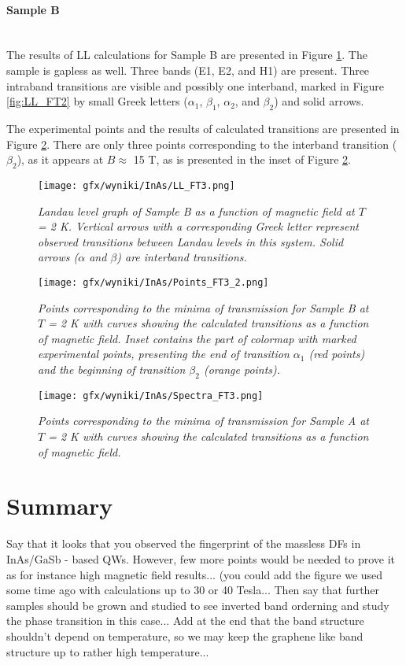 \documentclass[titlepage,a4paper]{book}
\newcommand{\wciecie}{\quad\phantom{v}}
\newcommand{\myparagraph}[1]{\paragraph{#1}\mbox{}\\}
\begin{document}
\myparagraph{Sample B}
\wciecie
The results of LL calculations for Sample B are presented in Figure \ref{fig:LL_FT3}. The sample is gapless as well. Three bands (E1, E2, and H1) are present. Three intraband transitions are visible and possibly one interband, marked in Figure \ref{fig:LL_FT2} by small Greek letters ($\alpha_1$, $\beta_1$, $\alpha_2$, and $\beta_2$) and solid arrows. 

The experimental points and the results of calculated transitions are presented in Figure \ref{fig:Points_FT3}. There are only three points corresponding to the interband transition ($\beta_2$), as it appears at $B \approx$ 15 T, as is presented in the inset of Figure \ref{fig:Points_FT3}.  

\begin{figure}[H]
	\centering
	\texttt{[image: gfx/wyniki/InAs/LL\_FT3.png]}
	\vspace{-10pt}
	\caption{\textit{Landau level graph of Sample B as a function of magnetic field at $T$ = 2 K. Vertical arrows with a corresponding Greek letter represent observed transitions between Landau levels in this system. Solid arrows ($\alpha$ and $\beta$) are interband transitions.}}
	\label{fig:LL_FT3}
\end{figure}

\begin{figure}[H]
	\centering
	\texttt{[image: gfx/wyniki/InAs/Points\_FT3\_2.png]}
	\vspace{-10pt}
	\caption{\textit{Points corresponding to the minima of transmission for Sample B at $T$ = 2 K with curves showing the calculated transitions as a function of magnetic field. Inset contains the part of colormap with marked experimental points, presenting the end of transition $\alpha_1$ (red points) and the beginning of transition $\beta_2$ (orange points). }}
	\label{fig:Points_FT3}
\end{figure}

\begin{figure}[H]
	\centering
	\texttt{[image: gfx/wyniki/InAs/Spectra\_FT3.png]}
	\vspace{-10pt}
	\caption{\textit{Points corresponding to the minima of transmission for Sample A at $T$ = 2 K with curves showing the calculated transitions as a function of magnetic field.}}
	\label{fig:Spectra_FT3}
\end{figure}

\section{Summary}
\wciecie
Say that it looks that you observed the fingerprint of the massless DFs in InAs/GaSb - based QWs. However, few more points would be needed to prove it as for instance high magnetic field results... (you could add the figure we used some time ago with calculations up to 30 or 40 Tesla...
Then say that further samples should be grown and studied to see inverted band orderning and study the phase transition in this case...
Add at the end that the band structure shouldn't depend on temperature, so we may keep the graphene like band structure up to rather high temperature...
\end{document}

